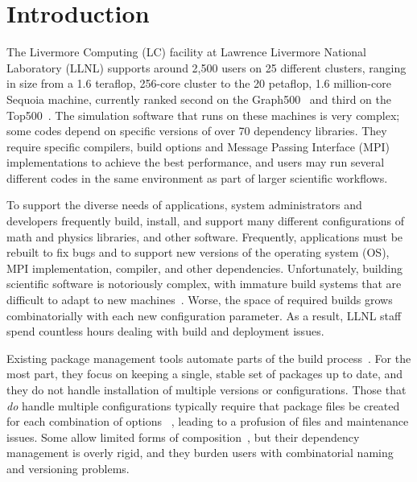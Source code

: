 
\section{Introduction}
\label{sec:intro}

The Livermore Computing (LC) facility at Lawrence Livermore National Laboratory
(LLNL) supports around 2,500 users on 25 different clusters, ranging
in size from a 1.6 teraflop, 256-core cluster to the
20 petaflop, 1.6 million-core Sequoia machine, currently ranked second on the 
Graph500~\cite{graph500} and third on the Top500~\cite{top500}.
%
%
The simulation software that runs on these machines is very complex; some
codes depend on specific versions of over 70 dependency libraries.
They require specific compilers, build options and Message Passing Interface (MPI)
implementations to
achieve the best performance, and users may run several
different codes in the same environment as part of larger
scientific workflows.

To support the diverse needs of applications, system administrators
and developers frequently build, install, and support many
different configurations of math and physics libraries, and
other software.  Frequently, applications must be rebuilt to fix bugs
and to support new versions of the operating system (OS), 
MPI implementation, compiler, and other
dependencies.  Unfortunately, building scientific software is
notoriously complex, with immature build systems that are difficult to
adapt to new
machines~\cite{dubois+:comp-sci-eng,hoste+:pyhpc12,wilson+:corr}.
Worse, the space of required builds grows combinatorially with each
new configuration parameter. As a result, LLNL staff spend countless
hours dealing with build and deployment issues.

Existing package management tools automate parts of the build
process~\cite{bsdports,digirolamo:smithy,dolstra+:icfp08,dolstra+:lisa04,hashdist,homebrew,hoste+:pyhpc12,macports,thiruvathukal:gentoo04}.
For the most part, they focus on keeping a single, stable set of
packages up to date, and they do not handle installation of multiple versions or
configurations.  Those that {\it do} handle multiple configurations
typically require that package files be created for each combination of
options~ \cite{digirolamo:smithy,dolstra+:icfp08,dolstra+:lisa04,hoste+:pyhpc12},
leading to a profusion of files and maintenance issues.
Some allow limited forms of 
composition~\cite{hoste+:pyhpc12,dolstra+:icfp08,dolstra+:lisa04}, but their
dependency management is overly rigid, and they burden users with
combinatorial naming and versioning problems.

